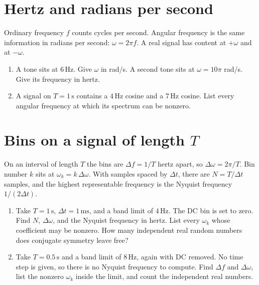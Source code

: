 \documentclass[11pt,letterpaper]{article}
\begin{document}
\section{Hertz and radians per second}

\begin{idea}
Ordinary frequency $f$ counts cycles per second. Angular frequency is the same information in radians per second: $\omega = 2\pi f$. A real signal has content at $+\omega$ and at $-\omega$.
\end{idea}

\begin{enumerate}
\item A tone sits at $6\,\mathrm{Hz}$. Give $\omega$ in rad/s. A second tone sits at $\omega = 10\pi$ rad/s. Give its frequency in hertz.
\item A signal on $T = 1\,\mathrm{s}$ contains a $4\,\mathrm{Hz}$ cosine and a $7\,\mathrm{Hz}$ cosine. List every angular frequency at which its spectrum can be nonzero.
\end{enumerate}

\section{Bins on a signal of length $T$}

\begin{idea}
On an interval of length $T$ the bins are $\Delta f = 1/T$ hertz apart, so $\Delta\omega = 2\pi/T$. Bin number $k$ sits at $\omega_k = k\,\Delta\omega$. With samples spaced by $\Delta t$, there are $N = T/\Delta t$ samples, and the highest representable frequency is the Nyquist frequency $1/(2\Delta t)$.
\end{idea}

\begin{enumerate}
\item Take $T = 1\,\mathrm{s}$, $\Delta t = 1\,\mathrm{ms}$, and a band limit of $4\,\mathrm{Hz}$. The DC bin is set to zero. Find $N$, $\Delta\omega$, and the Nyquist frequency in hertz. List every $\omega_k$ whose coefficient may be nonzero. How many independent real random numbers does conjugate symmetry leave free?
\item Take $T = 0.5\,\mathrm{s}$ and a band limit of $8\,\mathrm{Hz}$, again with DC removed. No time step is given, so there is no Nyquist frequency to compute. Find $\Delta f$ and $\Delta\omega$, list the nonzero $\omega_k$ inside the limit, and count the independent real numbers.
\end{enumerate}
\end{document}
